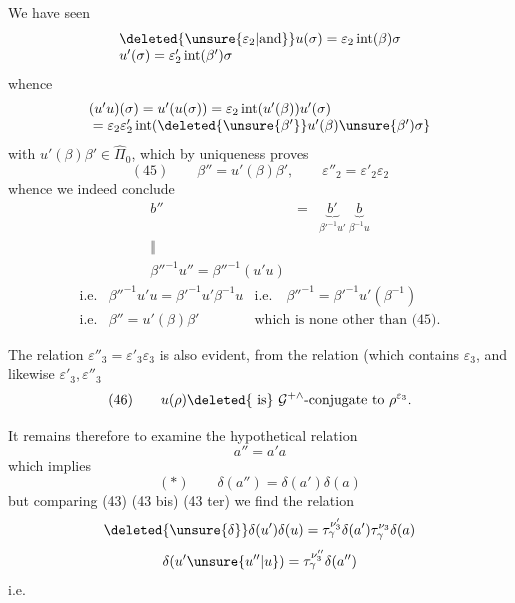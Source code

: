 

We have seen
\[
\begin{array}{l}
\deleted{\unsure{\varepsilon_2|\text{and}}}u(\sigma)
 =\varepsilon_2\operatorname{int}(\beta)\sigma\\
u'(\sigma)=\varepsilon'_2\operatorname{int}(\beta')\sigma
\end{array}
\]
whence
\[
\begin{array}{l}
(u'u)(\sigma)=u'(u(\sigma))
 =\varepsilon_2\operatorname{int}(u'(\beta))u'(\sigma)\\
\hfill{}=\varepsilon_2\varepsilon'_2
 \operatorname{int}(\deleted{\unsure{\beta'}}u'(\beta)\unsure{\beta')\sigma}
\end{array}
\]
with \(u'(\beta)\beta'\in\widehat{\Pi}_0\), which by uniqueness proves
\[
(45)\qquad
\beta''=u'(\beta)\beta',\qquad
\varepsilon''_2=\varepsilon'_2\varepsilon_2
\]
whence we indeed conclude
\[
\begin{array}{ccc}
b''&=&\underbrace{b'}_{\beta'^{-1}u'}\ \underbrace{b}_{\beta^{-1}u}\\
\Vert&&\\
\beta''^{-1}u''=\beta''^{-1}(u'u)&&
\end{array}
\]
\[
\begin{array}{lll}
\text{i.e.}&\beta''^{-1}u'u=\beta'^{-1}u'\beta^{-1}u
 &\text{i.e.}\quad\beta''^{-1}=\beta'^{-1}u'(\beta^{-1})\\
\text{i.e.}&\beta''=u'(\beta)\beta'
 &\text{which is none other than (45).}
\end{array}
\]

The relation \(\varepsilon''_3=\varepsilon'_3\varepsilon_3\) is also
evident,  from the relation (which contains \(\varepsilon_3\),
and likewise \(\varepsilon'_3,\varepsilon''_3\)
\[
(46)\qquad
u(\rho)\deleted{\text{ is}}\ \mathcal{G}^{+\wedge}\text{-conjugate to }\rho^{\varepsilon_3}.
\]

It remains therefore to examine the hypothetical relation
\[
a''=a'a
\]
which  implies
\[
(*)\qquad\delta(a'')=\delta(a')\delta(a)
\]
but comparing (43) (43 bis) (43 ter) we find the relation
\[
\deleted{\unsure{\delta}}\delta(u')\delta(u)
 =\tau_\gamma^{\nu'_3}\delta(a')\tau_\gamma^{\nu_3}\delta(a)
\]
\[
\delta(u'\unsure{u''|u})=\tau_\gamma^{\nu''_3}\delta(a'')
\]
\hfill i.e.

